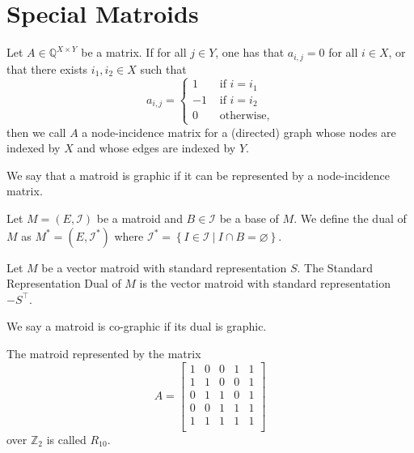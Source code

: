 \chapter{Special Matroids}

\begin{definition}
    \label{Matrix.IsGraphic}
    \leanok
    Let $A \in \mathbb{Q}^{X \times Y}$ be a matrix. If for all $j \in Y$, one has that $a_{i,j} = 0$ for all $i \in X$, or that there exists $i_1,i_2 \in X$ such that
    \[
    a_{i,j} = \begin{cases}
        1 & \text{ if $i = i_1$} \\
        -1 & \text{ if $i = i_2$} \\
        0 & \text{ otherwise},
    \end{cases}
    \]
    then we call $A$ a node-incidence matrix for a (directed) graph whose nodes are indexed by $X$ and whose edges are indexed by $Y$.
\end{definition}

\begin{definition}
    \label{Matroid.IsGraphic}
    \leanok
    We say that a matroid is graphic if it can be represented by a node-incidence matrix.
\end{definition}

\begin{definition}
    \label{Matroid.dualIndepMatroid}
    \leanok
    Let $M = (E, \mathcal{I})$ be a matroid and $B \in \mathcal I$ be a base of $M$. We define the dual of $M$ as $M^* = (E, \mathcal{I}^*)$ where $\mathcal{I}^* = \left\{ I \in \mathcal I  \ | \ I \cap B = \varnothing \right\}.$
\end{definition}

\begin{definition}
    \label{StandardRepr.dual}
    \leanok
    Let $M$ be a vector matroid with standard representation $S$. The Standard Representation Dual of $M$ is the vector matroid with standard representation $-S^\intercal$.
\end{definition}

\begin{definition}
    \label{Matroid.IsCographic}
    \leanok
    We say a matroid is co-graphic if its dual is graphic.
\end{definition}

\begin{definition}
    \label{matroidR10}
    \leanok
    The matroid represented by the matrix
        \[A = \begin{bmatrix}
            1 & 0 & 0 & 1 & 1 \\
            1 & 1 & 0 & 0 & 1 \\
            0 & 1 & 1 & 0 & 1 \\
            0 & 0 & 1 & 1 & 1 \\
            1 & 1 & 1 & 1 & 1 \\
        \end{bmatrix}\]
        over $\mathbb{Z}_2$ is called $R_{10}.$
    \end{definition}


